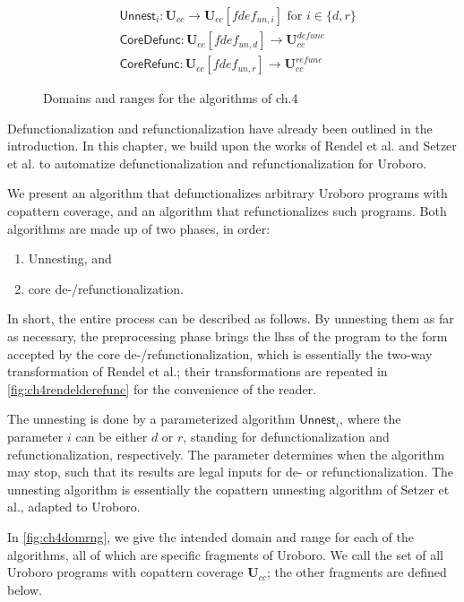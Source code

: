 \begin{figure}
\begin{align*}
& \textsf{Unnest}_i: \mathbf{U}_{cc} \to \mathbf{U}_{cc}[fdef_{un,i}] \text{ for } i \in \{d,r\} \\
& \textsf{CoreDefunc}: \mathbf{U}_{cc}[fdef_{un,d}] \to \mathbf{U}^{defunc}_{cc} \\
& \textsf{CoreRefunc}: \mathbf{U}_{cc}[fdef_{un,r}] \to \mathbf{U}^{refunc}_{cc}
\end{align*}
\caption{Domains and ranges for the algorithms of ch.4}
\label{fig:ch4domrng}
\end{figure}

Defunctionalization and refunctionalization have already been outlined in the introduction. In this chapter, we build upon the works of Rendel et al.\cite{rendel15automatic} and Setzer et al.\cite{setzer14unnesting} to automatize defunctionalization and refunctionalization for Uroboro. 

We present an algorithm that defunctionalizes arbitrary Uroboro programs with copattern coverage, and an algorithm that refunctionalizes such programs. Both algorithms are made up of two phases, in order:
\begin{enumerate}
\item Unnesting, and
\item core de-/refunctionalization.
\end{enumerate}

In short, the entire process can be described as follows. By unnesting them as far as necessary, the preprocessing phase brings the lhss of the program to the form accepted by the core de-/refunctionalization, which is essentially the two-way transformation of Rendel et al.; their transformations are repeated in \autoref{fig:ch4rendelderefunc} for the convenience of the reader.

The unnesting is done by a parameterized algorithm $\textsf{Unnest}_i$, where the parameter $i$ can be either $d$ or $r$, standing for defunctionalization and refunctionalization, respectively. The parameter determines when the algorithm may stop, such that its results are legal inputs for de- or refunctionalization. The unnesting algorithm is essentially the copattern unnesting algorithm of Setzer et al.\cite{setzer14unnesting}, adapted to Uroboro.

In \autoref{fig:ch4domrng}, we give the intended domain and range for each of the algorithms, all of which are specific fragments of Uroboro. We call the set of all Uroboro programs with copattern coverage $\mathbf{U}_{cc}$; the other fragments are defined below.

